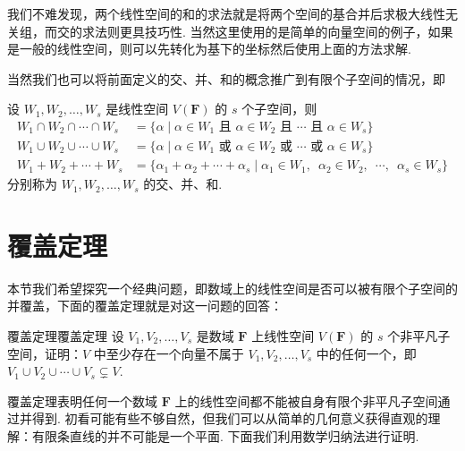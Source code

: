 我们不难发现，两个线性空间的和的求法就是将两个空间的基合并后求极大线性无关组，而交的求法则更具技巧性. 当然这里使用的是简单的向量空间的例子，如果是一般的线性空间，则可以先转化为基下的坐标然后使用上面的方法求解.

当然我们也可以将前面定义的交、并、和的概念推广到有限个子空间的情况，即
\begin{definition}{}{}
    设 $W_1,W_2,\ldots,W_s$ 是线性空间 $V(\mathbf{F})$ 的 $s$ 个子空间，则
    \begin{align*}
        W_1 \cap W_2 \cap \cdots \cap W_s & =\{\alpha \mid \alpha\in W_1 \text{~且~} \alpha\in W_2 \text{~且~} \cdots \text{~且~} \alpha\in W_s\} \\
        W_1 \cup W_2 \cup \cdots \cup W_s & =\{\alpha \mid \alpha\in W_1 \text{~或~} \alpha\in W_2 \text{~或~} \cdots \text{~或~} \alpha\in W_s\} \\
        W_1 + W_2 + \cdots + W_s          & =\{\alpha_1+\alpha_2+\cdots+\alpha_s \mid \alpha_1\in W_1,\enspace\alpha_2\in W_2,\enspace\cdots,\enspace\alpha_s\in W_s\}
    \end{align*}
    分别称为 $W_1,W_2,\ldots,W_s$ 的交、并、和.
\end{definition}

\section{覆盖定理}

本节我们希望探究一个经典问题，即数域上的线性空间是否可以被有限个子空间的并覆盖，下面的覆盖定理就是对这一问题的回答：

\begin{theorem}{覆盖定理}{覆盖定理} 
    设 $V_1,V_2,\ldots,V_s$ 是数域 $\mathbf{F}$ 上线性空间 $V(\mathbf{F})$ 的 $s$ 个非平凡子空间，证明：$V$ 中至少存在一个向量不属于 $V_1,V_2,\ldots,V_s$ 中的任何一个，即 $V_1 \cup V_2 \cup \cdots \cup V_s\subsetneq V$.
\end{theorem}

覆盖定理表明任何一个数域 $\mathbf{F}$ 上的线性空间都不能被自身有限个非平凡子空间通过并得到. 初看可能有些不够自然，但我们可以从简单的几何意义获得直观的理解：有限条直线的并不可能是一个平面. 下面我们利用数学归纳法进行证明.

